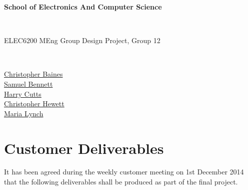 \documentclass[12pt,a4paper]{article}
\begin{document}

\begin{Large}
\textbf{School of Electronics And Computer Science
}\end{Large}\\

\begin{Large}
ELEC6200 MEng Group Design Project, Group 12
\end{Large}\\

\begin{center}

{\href{mailto:cb15g11@soton.ac.uk}{Christopher Baines}}\\
{\href{mailto:sb21g11@soton.ac.uk}{Samuel Bennett}}\\
{\href{mailto:hc13g11@soton.ac.uk}{Harry Cutts}}\\
{\href{mailto:cjh1e11@soton.ac.uk}{Christopher Hewett}}\\
{\href{mailto:ml26g11@soton.ac.uk}{Maria Lynch}}

\end{center}

\section*{Customer Deliverables}


It has been agreed during the weekly customer meeting on 1st December 2014 that the following deliverables shall be produced as part of the final project.
\end{document}
